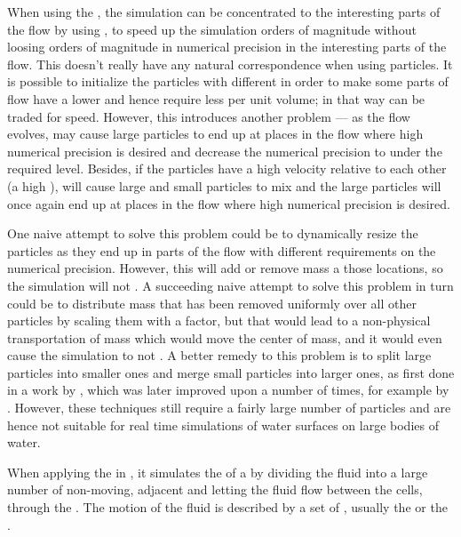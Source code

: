 When using the \FVM, the simulation can be concentrated to the interesting parts of the flow by using  \citep{Popinet2003,Losasso2004}, to speed up the simulation orders of magnitude without loosing orders of magnitude in numerical precision in the interesting parts of the flow. This doesn't really have any natural correspondence when using particles. It is possible to initialize the particles with different  in order to make some parts of flow have a lower  and hence require less  per unit volume; in that way  can be traded for speed. However, this introduces another problem --- as the flow evolves, \advection may cause large particles to end up at places in the flow where high numerical precision is desired and decrease the numerical precision to under the required level. Besides, if the particles have a high velocity relative to each other (a high \temperature), \diffusion will cause large and small particles to mix and the large particles will once again end up at places in the flow where high numerical precision is desired.

One naive attempt to solve this problem could be to dynamically resize the particles as they end up in parts of the flow with different requirements on the numerical precision. However, this will add or remove mass a those locations, so the simulation will not . A succeeding naive attempt to solve this problem in turn could be to distribute mass that has been removed uniformly over all other particles by scaling them with a factor, but that would lead to a non-physical transportation of mass which would move the center of mass, and it would even cause the simulation to not . A better remedy to this problem is to split large particles into smaller ones and merge small particles into larger ones, as first done in a work by \citet{Desbrun1999}, which was later improved upon a number of times, for example by \citet{Yan2009}. However, these techniques still require a fairly large number of particles and are hence not suitable for real time simulations of water surfaces on large bodies of water.

When applying the \FVM in \CFD, it simulates the \flow of a \fluid by dividing the fluid into a large number of non-moving, adjacent \cells and letting the fluid flow between the cells, through the . The motion of the fluid is described by a set of \PDEs, usually the  or the .

